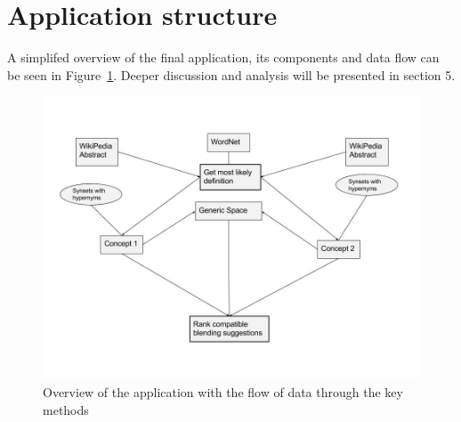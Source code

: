 








\section{Application structure}
A simplifed overview of the final application, its components and data flow can be seen in Figure~\ref{fig:application-structure}. Deeper discussion and analysis will be presented in section 5.

\begin{figure}
\centering
\includegraphics[width=1\linewidth]{"Figures/Application structure"}
\caption{Overview of the application with the flow of data through the key methods}
\label{fig:application-structure}
\end{figure}

